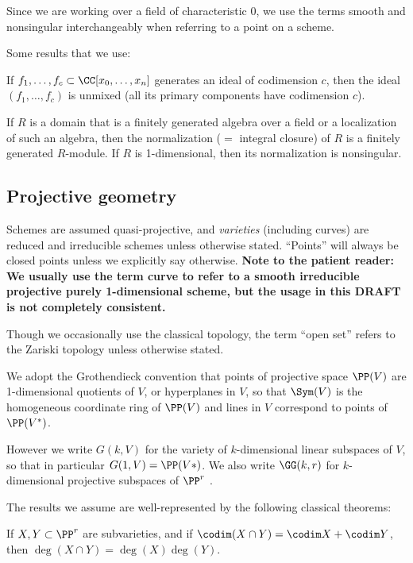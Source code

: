 Since we are working over  a field of characteristic 0, we use the terms smooth and nonsingular interchangeably when
referring to a point on a scheme.

Some results that we use:
 \begin{theorem}\label{Lasker}
If $f_1,\dots, f_c \subset \CC[x_0,\dots, x_n]$ generates an ideal of codimension $c$, then 
the ideal $(f_1,\dots, f_c)$ is unmixed (all its primary components have codimension $c$).
\end{theorem}

\begin{theorem}\label{finiteness of normalization}
 If $R$ is a domain that is a finitely generated algebra over a field or a localization of such an algebra, then the
normalization ($=$ integral closure) of $R$ is a finitely generated $R$-module.
If $R$ is 1-dimensional, then its normalization is nonsingular.
\end{theorem}

\subsection{Projective geometry}
 
Schemes are assumed quasi-projective, and \emph{varieties} (including curves) are reduced and irreducible schemes unless otherwise stated. ``Points'' will always be closed points unless we explicitly say otherwise. 
{\bf Note to the patient reader: We usually use the term curve to refer to a smooth irreducible projective purely 1-dimensional scheme, but the usage in this DRAFT is not completely consistent.}

Though we occasionally use the classical topology, 
the term ``open set'' refers to the Zariski topology unless otherwise stated.

We adopt the Grothendieck convention that points of projective space $\PP(V)$ are 1-dimensional quotients of $V$, or hyperplanes in $V$, so that
$\Sym(V)$ is the homogeneous coordinate ring of $\PP(V)$ and lines in $V$ correspond to points of $\PP(V^*)$.

However we write $G(k,V)$ for the variety of $k$-dimensional linear subspaces of $V$, so that in particular $G(1,V) = \PP(V*)$.
We also write $\GG(k,r)$ for $k$-dimensional
projective subspaces of $\PP^r$ .

The results we assume are
 well-represented by the following classical theorems:

\begin{theorem}
If $X,Y\subset \PP^r$ are subvarieties, and if $\codim(X\cap Y) = \codim X + \codim Y$,
then $\deg (X\cap Y) = \deg(X)\deg(Y)$.
\end{theorem}


